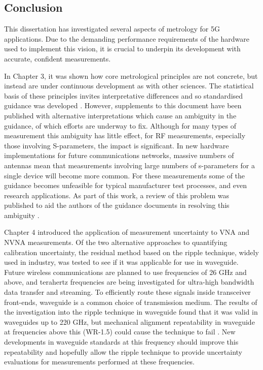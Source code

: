\documentclass[../thesis/thesis.tex]{subfiles}
\begin{document}
\begin{refsection}
\chapter{Conclusion}

This dissertation has investigated several aspects of metrology for 5G applications. Due to the demanding performance requirements of the hardware used to implement this vision, it is crucial to underpin its development with accurate, confident measurements.

In Chapter 3, it was shown how core metrological principles are not concrete, but instead are under continuous development as with other sciences. The statistical basis of these principles invites interpretative differences and so standardised guidance was developed \cite{GUM_2008}. However, supplements to this document have been published \cite{GUM_S1, GUM_S2} with alternative interpretations which cause an ambiguity in the guidance, of which efforts are underway to fix. Although for many types of measurement this ambiguity has little effect, for RF measurements, especially those involving S-parameters, the impact is significant. In new hardware implementations for future communications networks, massive numbers of antennas mean that measurements involving large numbers of s-parameters for a single device will become more common. For these measurements some of the guidance becomes unfeasible for typical manufacturer test processes, and even research applications. As part of this work, a review of this problem was published to aid the authors of the guidance documents in resolving this ambiguity \cite{Stant_2016}.

Chapter 4 introduced the application of measurement uncertainty to VNA and NVNA measurements. Of the two alternative approaches to quantifying calibration uncertainty, the residual method based on the ripple technique, widely used in industry, was tested to see if it was applicable for use in waveguide. Future wireless communications are planned to use frequencies of 26 GHz and above, and terahertz frequencies are being investigated for ultra-high bandwidth data transfer and streaming. To efficiently route these signals inside transceiver front-ends, waveguide is a common choice of transmission medium. The results of the investigation into the ripple technique in waveguide found that it was valid in waveguides up to 220 GHz, but mechanical alignment repeatability in waveguide at frequencies above this (WR-1.5) could cause the technique to fail \cite{Stant_2016_Coll,Stant_2017}. New developments in waveguide standards at this frequency should improve this repeatability and hopefully allow the ripple technique to provide uncertainty evaluations for measurements performed at these frequencies.


\end{refsection}
\end{document}
